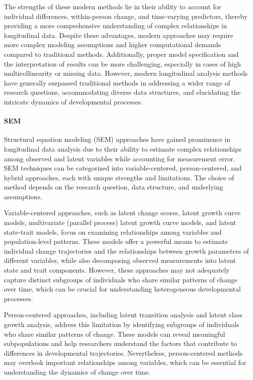 \documentclass[
  number,
  preprint,
  3p,
  twocolumn]{elsarticle}
\let\oldparagraph\paragraph
\renewcommand{\paragraph}[1]{\oldparagraph{#1}\mbox{}}
\begin{document}
The strengths of these modern methods lie in their ability to account
for individual differences, within-person change, and time-varying
predictors, thereby providing a more comprehensive understanding of
complex relationships in longitudinal data. Despite these advantages,
modern approaches may require more complex modeling assumptions and
higher computational demands compared to traditional methods.
Additionally, proper model specification and the interpretation of
results can be more challenging, especially in cases of high
multicollinearity or missing data. However, modern longitudinal analysis
methods have generally surpassed traditional methods in addressing a
wider range of research questions, accommodating diverse data
structures, and elucidating the intricate dynamics of developmental
processes.

\hypertarget{sem}{%
\paragraph{SEM}\label{sem}}

Structural equation modeling (SEM) approaches have gained prominence in
longitudinal data analysis due to their ability to estimate complex
relationships among observed and latent variables while accounting for
measurement error. SEM techniques can be categorized into
variable-centered, person-centered, and hybrid approaches, each with
unique strengths and limitations. The choice of method depends on the
research question, data structure, and underlying assumptions.

Variable-centered approaches, such as latent change scores, latent
growth curve models, multivariate (parallel process) latent growth curve
models, and latent state-trait models, focus on examining relationships
among variables and population-level patterns. These models offer a
powerful means to estimate individual change trajectories and the
relationships between growth parameters of different variables, while
also decomposing observed measurements into latent state and trait
components. However, these approaches may not adequately capture
distinct subgroups of individuals who share similar patterns of change
over time, which can be crucial for understanding heterogeneous
developmental processes.

Person-centered approaches, including latent transition analysis and
latent class growth analysis, address this limitation by identifying
subgroups of individuals who share similar patterns of change. These
models can reveal meaningful subpopulations and help researchers
understand the factors that contribute to differences in developmental
trajectories. Nevertheless, person-centered methods may overlook
important relationships among variables, which can be essential for
understanding the dynamics of change over time.
\end{document}
